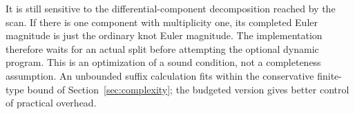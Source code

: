 It is still sensitive to the differential-component decomposition reached
by the scan. If there is one component with multiplicity one, its completed
Euler magnitude is just the ordinary knot Euler magnitude. The implementation
therefore waits for an actual split before attempting the optional dynamic
program. This is an optimization of a sound condition, not a completeness
assumption. An unbounded suffix calculation fits within the conservative
finite-type bound of Section~\ref{sec:complexity}; the budgeted version gives
better control of practical overhead.
